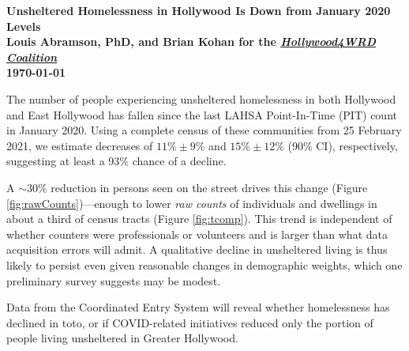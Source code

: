 \documentclass[11pt]{article}
\def\resp{respectively}
\begin{document}

\begin{center}
	\Large\bf Unsheltered Homelessness in Hollywood Is Down from January 2020 Levels\\
	\vspace{1ex}
	{\normalsize\rm Louis Abramson, PhD, and Brian Kohan 
	for the \href{http://www.hollywood4wrd.live}{\it Hollywood4WRD Coalition} \\ \today}


\end{center}

 The number of people experiencing unsheltered homelessness in both Hollywood 
and East Hollywood has fallen since the last LAHSA Point-In-Time (PIT) count in January 2020. %
Using a complete census of these communities from 25 February 2021, we estimate decreases of 
$11\%\pm9\%$ and $15\%\pm12\%$ (90\% CI), \resp, suggesting at least a 93\% chance of a decline.

A $\sim$30\% reduction in persons seen on the street drives this change (Figure \ref{fig:rawCounts})---enough 
to lower {\it raw counts} of individuals and dwellings in about a third of census tracts (Figure \ref{fig:tcomp}). 
This trend is independent of whether counters were professionals or volunteers and is larger than what data acquisition 
errors will admit. A qualitative decline in unsheltered living is thus likely to persist even given reasonable 
changes in demographic weights, which one preliminary survey suggests may be modest. 

Data from the Coordinated Entry System will reveal whether homelessness has declined in toto, or if
COVID-related initiatives reduced only the portion of people living unsheltered in Greater Hollywood.
\end{document}
